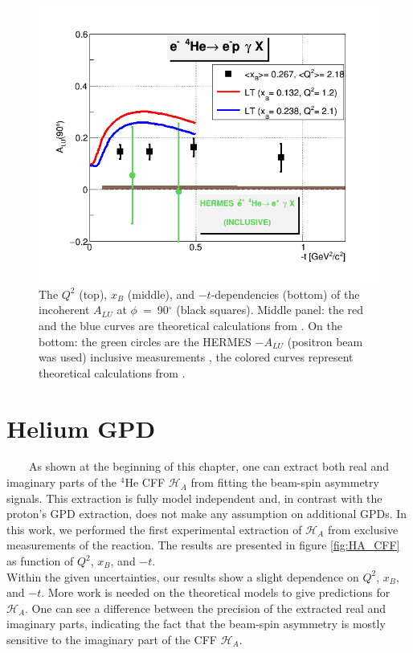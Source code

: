 \begin{figure}[tpb]
\includegraphics[scale=0.37]{fig_ch5/incoh_alu_t_90.png} 
\caption{The $Q^{2}$ 
   (top), $x_{B}$ (middle), and $-t$-dependencies (bottom) 
   of the incoherent $A_{LU}$ at $\phi$~=~90$^{\circ}$ (black squares). Middle panel: 
   the red and the blue curves are theoretical calculations from 
   \cite{simonetta_2}. On the bottom: the green circles are the HERMES 
$-A_{LU}$ (positron beam was used) inclusive measurements \cite{HERMES_BSA}, 
the colored curves represent theoretical calculations from \cite{simonetta_2}.  
} \label{fig:incoh_Q2_xB_t_ALU}
\end{figure}


\section{Helium GPD}
~~~~As shown at the beginning of this chapter, one can extract both real and
imaginary parts of the 
$^4$He CFF $\mathcal{H}_A$ from fitting the beam-spin asymmetry signals. This extraction
is fully model independent and, in contrast with the proton's GPD extraction, does not
make any assumption on additional GPDs. In this 
work, we performed the first experimental extraction of $\mathcal{H}_A$ from 
exclusive measurements of the reaction. The results are presented in figure 
\ref{fig:HA_CFF} as function of $Q^{2}$, $x_B$, and $-t$.\\

Within the given uncertainties, our results show a slight dependence on 
$Q^{2}$, $x_B$, and $-t$.  More work is needed on the theoretical models to 
give predictions for $\mathcal{H}_A$.  One can see a difference between the 
precision of the extracted real and imaginary parts, indicating the fact that 
the beam-spin asymmetry is mostly sensitive to the imaginary part of the  CFF 
$\mathcal{H}_A$.

